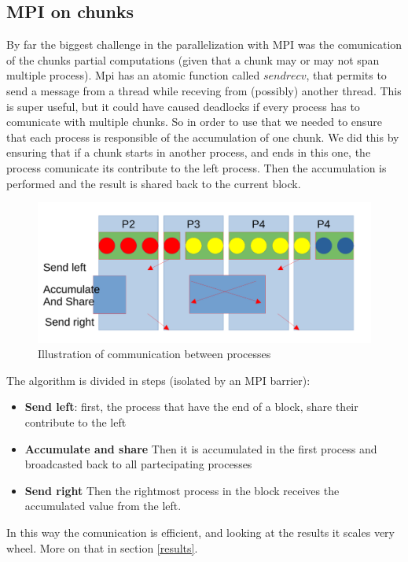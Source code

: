 \documentclass[10pt]{article}
\begin{document}
\begin{multicols}{2}
\subsection*{MPI on chunks}
By far the biggest challenge in the parallelization with MPI was the comunication of the chunks partial computations (given that a chunk may or may not span multiple process).
Mpi has an atomic function called $sendrecv$, that permits to send a message from a thread while receving from (possibly) another thread.
This is super useful, but it could have caused deadlocks if every process has to comunicate with multiple chunks.
So in order to use that we needed to ensure that each process is responsible of the accumulation of one chunk.
We did this by ensuring that if a chunk starts in another process, and ends in this one, the process comunicate its contribute to the left process. Then the accumulation is performed and the result is shared back to the current block.

\begin{figure}[H]
  \includegraphics[scale=0.25]{img/MPI.png}
  \centering
  \caption{Illustration of communication between processes}
  \label{fig:MPI}
\end{figure}

The algorithm is divided in steps (isolated by an MPI barrier):
\begin{itemize}
  \item \textbf{Send left}: first, the process that have the end of a block, share their contribute to the left
  \item \textbf{Accumulate and share} Then it is accumulated in the first process and broadcasted back to all partecipating processes
  \item \textbf{Send right} Then the rightmost process in the block receives the accumulated value from the left.
\end{itemize}

In this way the comunication is efficient, and looking at the results it scales very wheel. More on that in section \ref{results}.



\end{multicols}
\end{document}
